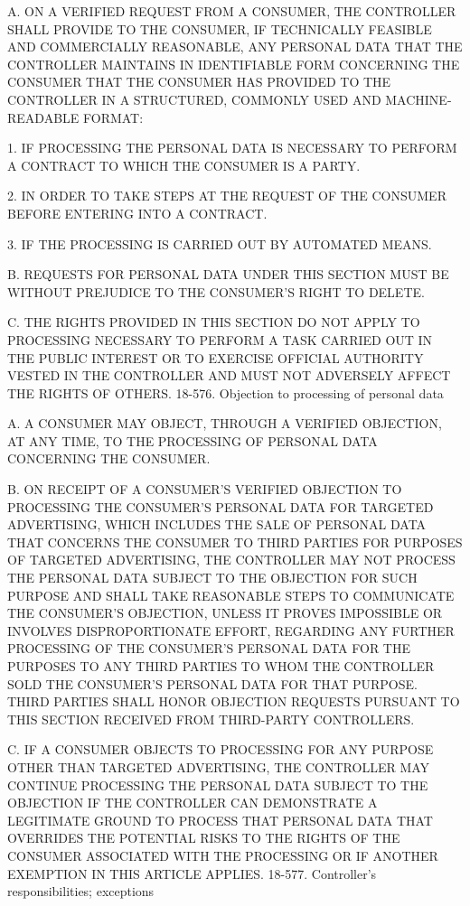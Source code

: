 A. ON A VERIFIED REQUEST FROM A CONSUMER, THE CONTROLLER SHALL PROVIDE TO THE CONSUMER, IF TECHNICALLY FEASIBLE AND COMMERCIALLY REASONABLE, ANY PERSONAL DATA THAT THE CONTROLLER MAINTAINS IN IDENTIFIABLE FORM CONCERNING THE CONSUMER THAT THE CONSUMER HAS PROVIDED TO THE CONTROLLER IN A STRUCTURED, COMMONLY USED AND MACHINE-READABLE FORMAT:

1. IF PROCESSING THE PERSONAL DATA IS NECESSARY TO PERFORM A CONTRACT TO WHICH THE CONSUMER IS A PARTY.

2. IN ORDER TO TAKE STEPS AT THE REQUEST OF THE CONSUMER BEFORE ENTERING INTO A CONTRACT.

3. IF THE PROCESSING IS CARRIED OUT BY AUTOMATED MEANS.

B. REQUESTS FOR PERSONAL DATA UNDER THIS SECTION MUST BE WITHOUT PREJUDICE TO THE CONSUMER'S RIGHT TO DELETE.

C. THE RIGHTS PROVIDED IN THIS SECTION DO NOT APPLY TO PROCESSING NECESSARY TO PERFORM A TASK CARRIED OUT IN THE PUBLIC INTEREST OR TO EXERCISE OFFICIAL AUTHORITY VESTED IN THE CONTROLLER AND MUST NOT ADVERSELY AFFECT THE RIGHTS OF OTHERS.
18-576. Objection to processing of personal data

A. A CONSUMER MAY OBJECT, THROUGH A VERIFIED OBJECTION, AT ANY TIME, TO THE PROCESSING OF PERSONAL DATA CONCERNING THE CONSUMER.

B. ON RECEIPT OF A CONSUMER'S VERIFIED OBJECTION TO PROCESSING THE CONSUMER'S PERSONAL DATA FOR TARGETED ADVERTISING, WHICH INCLUDES THE SALE OF PERSONAL DATA THAT CONCERNS THE CONSUMER TO THIRD PARTIES FOR PURPOSES OF TARGETED ADVERTISING, THE CONTROLLER MAY NOT PROCESS THE PERSONAL DATA SUBJECT TO THE OBJECTION FOR SUCH PURPOSE AND SHALL TAKE REASONABLE STEPS TO COMMUNICATE THE CONSUMER'S OBJECTION, UNLESS IT PROVES IMPOSSIBLE OR INVOLVES DISPROPORTIONATE EFFORT, REGARDING ANY FURTHER PROCESSING OF THE CONSUMER'S PERSONAL DATA FOR THE PURPOSES TO ANY THIRD PARTIES TO WHOM THE CONTROLLER SOLD THE CONSUMER'S PERSONAL DATA FOR THAT PURPOSE. THIRD PARTIES SHALL HONOR OBJECTION REQUESTS PURSUANT TO THIS SECTION RECEIVED FROM THIRD-PARTY CONTROLLERS.

C. IF A CONSUMER OBJECTS TO PROCESSING FOR ANY PURPOSE OTHER THAN TARGETED ADVERTISING, THE CONTROLLER MAY CONTINUE PROCESSING THE PERSONAL DATA SUBJECT TO THE OBJECTION IF THE CONTROLLER CAN DEMONSTRATE A LEGITIMATE GROUND TO PROCESS THAT PERSONAL DATA THAT OVERRIDES THE POTENTIAL RISKS TO THE RIGHTS OF THE CONSUMER ASSOCIATED WITH THE PROCESSING OR IF ANOTHER EXEMPTION IN THIS ARTICLE APPLIES.
18-577. Controller's responsibilities; exceptions

